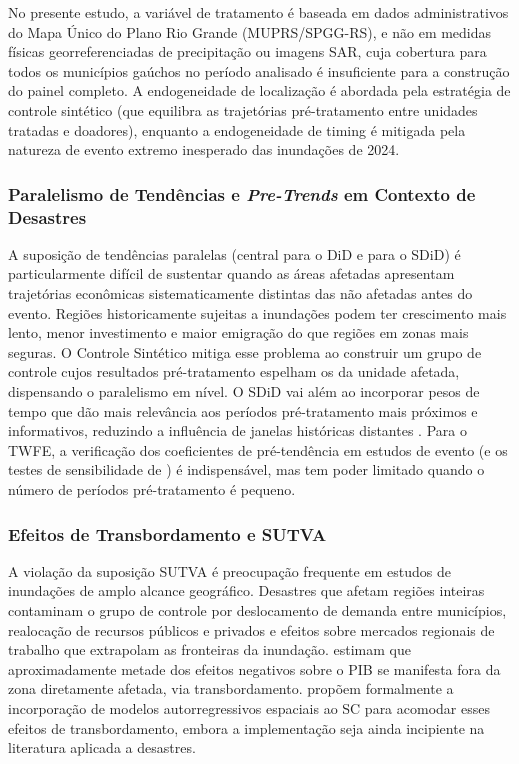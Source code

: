 \documentclass[a4paper,12pt]{article}
\begin{document}
No presente estudo, a variável de tratamento é baseada em dados administrativos do Mapa
Único do Plano Rio Grande (MUPRS/SPGG-RS), e não em medidas físicas georreferenciadas
de precipitação ou imagens SAR, cuja cobertura para todos os municípios gaúchos no
período analisado é insuficiente para a construção do painel completo. A endogeneidade
de localização é abordada pela estratégia de controle sintético (que equilibra as
trajetórias pré-tratamento entre unidades tratadas e doadores), enquanto a
endogeneidade de timing é mitigada pela natureza de evento extremo inesperado das
inundações de 2024.

\subsubsection{Paralelismo de Tendências e \textit{Pre-Trends} em Contexto de
Desastres}

A suposição de tendências paralelas (central para o DiD e para o SDiD) é
particularmente difícil de sustentar quando as áreas afetadas apresentam trajetórias
econômicas sistematicamente distintas das não afetadas antes do evento. Regiões
historicamente sujeitas a inundações podem ter crescimento mais lento, menor
investimento e maior emigração do que regiões em zonas mais seguras. O Controle
Sintético mitiga esse problema ao construir um grupo de controle cujos resultados
pré-tratamento espelham os da unidade afetada, dispensando o paralelismo em nível. O
SDiD vai além ao incorporar pesos de tempo que dão mais relevância aos períodos
pré-tratamento mais próximos e informativos, reduzindo a influência de janelas históricas
distantes \cite{arkhangelsky2021}. Para o TWFE, a verificação dos coeficientes de
pré-tendência em estudos de evento (e os testes de sensibilidade de )
é indispensável, mas tem poder limitado quando o número de períodos pré-tratamento é
pequeno.

\subsubsection{Efeitos de Transbordamento e SUTVA}

A violação da suposição SUTVA é preocupação frequente em estudos de inundações de
amplo alcance geográfico. Desastres que afetam regiões inteiras contaminam o grupo de
controle por deslocamento de demanda entre municípios, realocação de recursos públicos e
privados e efeitos sobre mercados regionais de trabalho que extrapolam as fronteiras da
inundação.  estimam que aproximadamente metade dos efeitos
negativos sobre o PIB se manifesta fora da zona diretamente afetada, via transbordamento.
 propõem formalmente a incorporação de modelos
autorregressivos espaciais ao SC para acomodar esses efeitos de transbordamento, embora a
implementação seja ainda incipiente na literatura aplicada a desastres.
\end{document}
